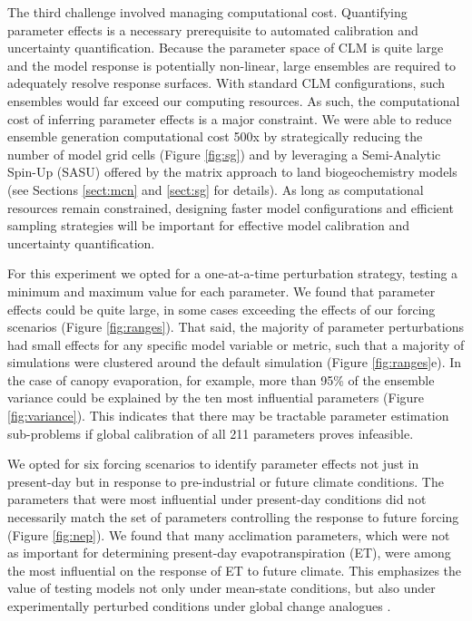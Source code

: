\documentclass[draft]{agujournal2019}
\begin{document}
The third challenge involved managing computational cost. Quantifying parameter effects is a necessary prerequisite to automated calibration and uncertainty quantification. Because the parameter space of CLM is quite large and the model response is potentially non-linear, large ensembles are required to adequately resolve response surfaces. With standard CLM configurations, such ensembles would far exceed our computing resources. As such, the computational cost of inferring parameter effects is a major constraint. We were able to reduce ensemble generation computational cost 500x by strategically reducing the number of model grid cells (Figure \ref{fig:sg}) and by leveraging a Semi-Analytic Spin-Up (SASU) offered by the matrix approach to land biogeochemistry models \cite{lu2020,luo2022,liao2023} (see Sections \ref{sect:mcn} and \ref{sect:sg} for details). As long as computational resources remain constrained, designing faster model configurations and efficient sampling strategies will be important for effective model calibration and uncertainty quantification. 

For this experiment we opted for a one-at-a-time perturbation strategy, testing a minimum and maximum value for each parameter. We found that parameter effects could be quite large, in some cases exceeding the effects of our forcing scenarios (Figure \ref{fig:ranges}). That said, the majority of parameter perturbations had small effects for any specific model variable or metric, such that a majority of simulations were clustered around the default simulation (Figure \ref{fig:ranges}e). In the case of canopy evaporation, for example, more than 95\% of the ensemble variance could be explained by the ten most influential parameters (Figure \ref{fig:variance}). This indicates that there may be tractable parameter estimation sub-problems if global calibration of all 211 parameters proves infeasible. 

We opted for six forcing scenarios to identify parameter effects not just in present-day but in response to pre-industrial or future climate conditions. The parameters that were most influential under present-day conditions did not necessarily match the set of parameters controlling the response to future forcing (Figure \ref{fig:nep}). We found that many acclimation parameters, which were not as important for determining present-day evapotranspiration (ET), were among the most influential on the response of ET to future climate. This emphasizes the value of testing models not only under mean-state conditions, but also under experimentally perturbed conditions under global change analogues \cite{wieder2019}. 
\end{document}
